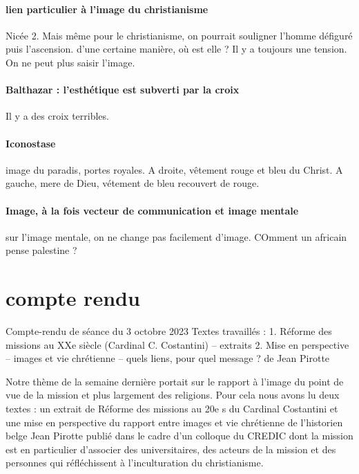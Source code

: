 \paragraph{lien particulier à l'image du christianisme} Nicée 2. Mais même pour le christianisme, on pourrait souligner l'homme défiguré puis l'ascension. d'une certaine manière, où est elle ? Il y a toujours une tension. On ne peut plus saisir l'image.

\paragraph{Balthazar : l'esthétique est subverti par la croix} Il y a des croix terribles. 

\paragraph{Iconostase} image du paradis, portes royales. A droite, vêtement rouge et bleu du Christ. A gauche, mere de Dieu, vétement de bleu recouvert de rouge. 

\paragraph{Image, à la fois vecteur de communication et image mentale} sur l'image mentale, on ne change pas facilement d'image. COmment un africain pense palestine ? 


\section{compte rendu}


Compte-rendu de séance du 3 octobre 2023
Textes travaillés :
1.	Réforme des missions au XXe siècle (Cardinal C. Costantini) – extraits
2.	Mise en perspective – images et vie chrétienne – quels liens, pour quel message ? de Jean Pirotte


Notre thème de la semaine dernière portait sur le rapport à l’image du point de vue de la mission et plus largement des religions. Pour cela nous avons lu deux textes : un extrait de Réforme des missions au 20e s du Cardinal Costantini et une mise en perspective du rapport entre images et vie chrétienne de l’historien belge Jean Pirotte publié dans le cadre d’un colloque du CREDIC dont la mission est en particulier d’associer des universitaires, des acteurs de la mission et des personnes qui réfléchissent à l'inculturation du christianisme.

